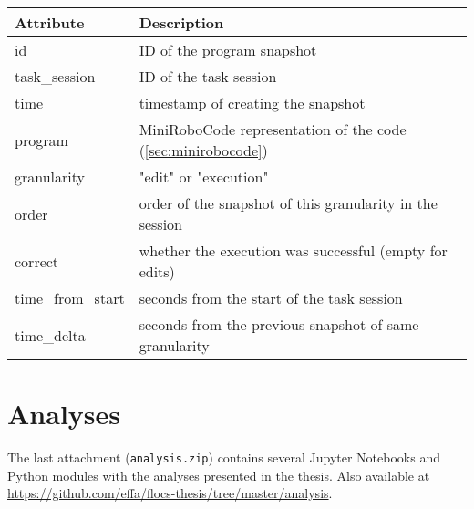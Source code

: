 \begin{tabular}{l l}
\toprule
Attribute & Description \\
\midrule
id & ID of the program snapshot \\
task\_session & ID of the task session \\
time & timestamp of creating the snapshot \\
program & MiniRoboCode representation of the code (\cref{sec:minirobocode}) \\
granularity & "edit" or "execution" \\
order & order of the snapshot of this granularity in the session \\
correct & whether the execution was successful (empty for edits) \\
time\_from\_start & seconds from the start of the task session \\
time\_delta & seconds from the previous snapshot of same granularity \\
\bottomrule
\end{tabular}


\section{Analyses}
\label{sec:attachment.analyses}

The last attachment (\texttt{analysis.zip})
contains several Jupyter Notebooks and Python modules with the analyses
presented in the thesis.
Also available at
\url{https://github.com/effa/flocs-thesis/tree/master/analysis}.
